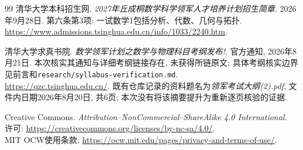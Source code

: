 \begin{thebibliography}{99}
清华大学本科招生网. \textit{2027年丘成桐数学科学领军人才培养计划招生简章}. 2026年9月28日. 第六条第3项: 一试数学1包括分析、代数、几何与拓扑.\\
\url{https://www.admissions.tsinghua.edu.cn/info/1033/2240.htm}.

清华大学求真书院. \textit{数学领军计划之数学与物理科目考纲发布!}. 官方通知, 2026年8月21日. 本次核实其通知与详细考纲链接存在, 未获得所链原文; 具体考纲核实边界见前言和\texttt{research/syllabus-verification.md}.\\
\url{https://qzc.tsinghua.edu.cn/}. 既有仓库记录的资料题名为\textit{领军考试大纲(2).pdf}, 文件内日期2026年8月20日, 共6页; 本次没有将该摘要提升为重新逐页核验的证据.

Creative Commons. \textit{Attribution--NonCommercial--ShareAlike 4.0 International}.\\
许可: \url{https://creativecommons.org/licenses/by-nc-sa/4.0/}.\\
MIT OCW使用条款: \url{https://ocw.mit.edu/pages/privacy-and-terms-of-use/}.
\end{thebibliography}
